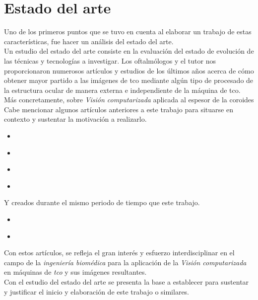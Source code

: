 \chapter{Estado del arte}\label{ch:estado_arte}
Uno de los primeros puntos que se tuvo en cuenta al elaborar un
trabajo de estas características, fue hacer un análisis del estado del
arte.\\
Un estudio del estado del arte consiste en la evaluación del estado de
evolución de las técnicas y tecnologías a investigar. Los oftalmólogos
y el tutor nos proporcionaron numerosos artículos y estudios de los
últimos años acerca de cómo obtener mayor partido a las imágenes de
\gls{tco} mediante algún tipo de procesado de la estructura ocular de
manera externa e independiente de la máquina de \gls{tco}. Más
concretamente, sobre \emph{Visión computarizada} aplicada al espesor
de la \gls{coroides}\\
Cabe mencionar algunos artículos anteriores a este trabajo para
situarse en contexto y sustentar la motivación a realizarlo.
\begin{itemize}
\item \emph{\citep*[Automated choroidal segmentation of 1060 nm OCT in
    healthy and pathologic eyes using a statistical
    model]{kajic2012automated}}
\item \emph{\citep*[Automatic segmentation of the choroid in enhanced
    depth imaging optical coherence tomography
    images]{tian2013automatic}}
\item \emph{\citep*[Automatic segmentation of choroidal thickness in
    optical coherence tomography]{alonso2013automatic}}
\item \emph{\citep*[Segmentation of choroidal boundary in enhanced
    depth imaging OCTs using a multiresolution texture based modeling
    in graph cuts]{danesh2014segmentation}}
\end{itemize}
Y creados durante el mismo periodo de tiempo que este trabajo.
\begin{itemize}
\item \emph{\citep*[Evaluation of choroidal thickness via enhanced
    depth-imaging optical coherence tomography in patients with
    systemic hypertension]{gok2015evaluation}}
\item \emph{\citep*[Optical modelling of the human
    retina]{ara2015optical}}
\end{itemize}
Con estos artículos, se refleja el gran interés y esfuerzo
interdisciplinar en el campo de la \emph{ingeniería biomédica} para la
aplicación de la \emph{Visión computarizada} en máquinas de
\emph{\gls{tco}} y sus imágenes resultantes.\\
Con el estudio del estado del arte se presenta la base a establecer
para sustentar y justificar el inicio y elaboración de este trabajo o
similares.
